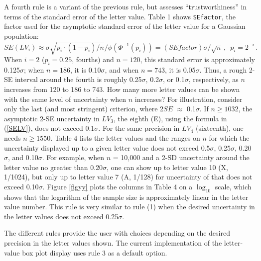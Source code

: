 \documentclass[oneside]{article}
\begin{document}

A fourth rule is a variant of the previous rule, but assesses
``trustworthiness'' in terms of the standard error of the
letter value.  Table 1 shows \texttt{SEfactor}, the factor
used for the asymptotic standard error of the letter value
for a Gaussian population:
\begin{equation}
SE(LV_i) \approx \sigma \sqrt{p_i \cdot (1 - p_i)/ n} / \phi(\Phi^{-1}(p_i)) 
 = (SEfactor) \sigma / \sqrt{n} \, ,
 \, \, \, p_i = 2^{-i} \, .
\label{SELV}
\end{equation}
When $i = 2$ ($p_i = 0.25$, fourths) and $n = 120$,
this standard error is approximately 0.125$\sigma$; when
$n = 186$, it is 0.10$\sigma$, and when $n = 743$, 
it is 0.05$\sigma$.  Thus, a rough 2-SE interval around
the fourth is roughly 0.25$\sigma$, 0.2$\sigma$, or 0.1$\sigma$,
respectively, as $n$ increases from 120 to 186 to 743.
How many more letter values can be shown with the same
level of uncertainty when $n$ increases?  For illustration,
consider only the last (and most stringent) criterion,
where 2$SE$ $\approx$ 0.1$\sigma$.  If $n \geq 1032$, 
the asymptotic 2-SE uncertainty in $LV_3$, the eighth (E), 
using the formula in (\ref{SELV}), does not exceed 0.1$\sigma$.
For the same precision in $LV_4$ (sixteenth), one needs
$n \geq 1550$.
Table 4 lists the letter values and the ranges on $n$
for which the uncertainty displayed up to a given letter
value does not exceed 0.5$\sigma$, 0.25$\sigma$,
0.20$\sigma$, and 0.10$\sigma$.  
For example, when $n$ = 10,000 and a 2-SD uncertainty
around the letter value no greater than 0.20$\sigma$, 
one can show up to letter value 10 (X, 1/1024), but only
up to letter value 7 (A, 1/128) for uncertainty of that
does not exceed 0.10$\sigma$.
Figure \ref{figyy} plots the columns in Table 4 on a $\log_10$
scale, which shows that the logarithm of the sample size is
approximately linear in the letter value number.  This rule
is very similar to rule (1) when the desired uncertainty
in the letter values does not exceed 0.25$\sigma$.

The different rules provide the user with choices depending
on the desired precision in the letter values shown.
The current implementation of the letter-value box plot 
display uses rule 3 as a default option.
\end{document}
